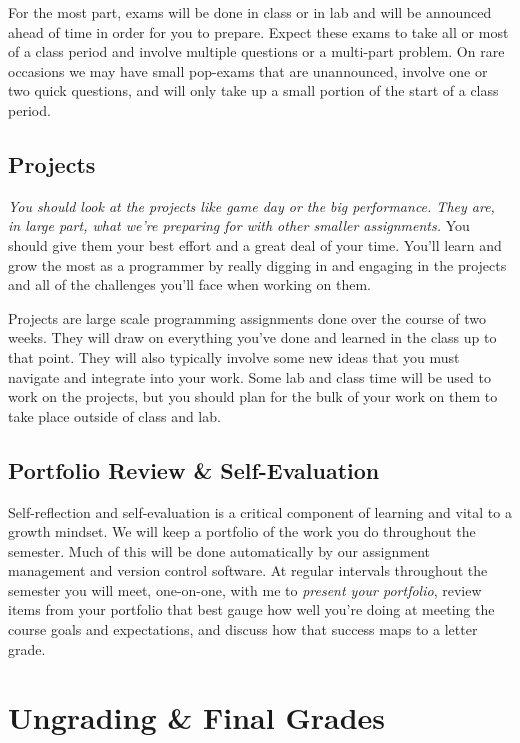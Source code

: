 \documentclass[10pt]{article}
\begin{document}
For the most part, exams will be done in class or in lab and will be announced ahead of time in order
for you to prepare.  Expect these exams to take all or most of a class period and involve multiple
questions or a multi-part problem. On rare occasions we may have small pop-exams that are unannounced,
involve one or two quick questions, and will only take up a small portion of the start of a class period.

\subsection*{Projects}

\textit{You should look at the projects like game day or the big performance. They are, in large part,
what we're preparing for with other smaller assignments.} You should give them your best effort and a
great deal of your time. You'll learn and grow the most as a programmer by really digging in and engaging
in the projects and all of the challenges you'll face when working on them.

Projects are large scale programming assignments done over the course of two weeks. They will
draw on everything you've done and learned in the class up to that point. They will also typically
involve some new ideas that you must navigate and integrate into your work. Some lab and class time
will be used to work on the projects, but you should plan for the bulk of your work on them to take
place outside of class and lab.


\subsection*{Portfolio Review \& Self-Evaluation}

Self-reflection and self-evaluation is a critical component of learning and vital to a growth mindset. We will keep a portfolio of the work you do throughout the semester. Much of this will be done automatically by our assignment management and version control software. At regular intervals throughout the semester you will meet, one-on-one, with me to \textit{present your portfolio}, review items from your portfolio that best gauge how well you're doing at meeting the course goals and expectations, and discuss how that success maps to a letter grade.  



\section{Ungrading \& Final Grades}
\end{document}
